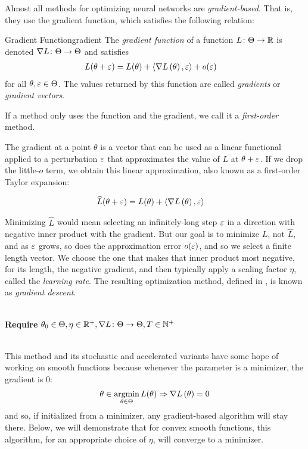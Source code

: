 \documentclass[../../thesis.tex]{subfiles}
\begin{document}
Almost all methods for optimizing neural networks
are \emph{gradient-based}.
That is, they use the gradient function,
which satisfies the following relation:

\begin{definition}{Gradient Function}{gradient}
	The \emph{gradient function} of a function $L \colon \Theta \to \mathbb{R}$
	is denoted $\nabla{L} \colon \Theta \to \Theta$
	and satisfies
	\begin{align}
		&L(\theta + \eps) = L(\theta) + \langle\grad{L}{\theta},\eps\rangle + o(\eps)\equationlabel{grad-def}
	\end{align}
	for all $\theta, \varepsilon \in \Theta$.
	The values returned by this function are called \emph{gradients}
	or \emph{gradient vectors}.
\end{definition}
\noindent If a method only uses the function and the gradient,
we call it a \emph{first-order} method.

The gradient at a point $\theta$ is a vector that can be used
as a linear functional applied to a perturbation $\varepsilon$ that approximates
the value of $L$ at $\theta + \varepsilon$.
If we drop the little-$o$ term,
we obtain this linear approximation,
also known as a first-order Taylor expansion:

\begin{align}
	&\widehat{L}(\theta + \varepsilon) = L(\theta) + \langle\nabla L\left(\theta\right),\varepsilon\rangle
\end{align}

Minimizing $\hat{L}$ would mean selecting an infinitely-long step $\varepsilon$
in a direction with negative inner product with the gradient.
But our goal is to minimize $L$, not $\hat{L}$,
and as $\varepsilon$ grows, so does the approximation error $o(\varepsilon)$,
and so we select a finite length vector.
We choose the one that makes that inner product most negative,
for its length,
the negative gradient,
and then typically apply a scaling factor $\eta$,
called the \emph{learning rate}.
The resulting optimization method,
defined in ,
is known as \emph{gradient descent}.
\\\\
\begin{algorithm}[H]
	\SetAlgoLined{}
	\textbf{Require} $\theta_0\in\Theta, \eta\in\mathbb{R}^+, \nabla{L}\colon\Theta\to\Theta, T\in\mathbb{N}^+$\\
	\caption{Gradient Descent}
\end{algorithm}
\ \\
This method
and its stochastic and accelerated variants
have some hope of working on smooth functions because
whenever the parameter is a minimizer,
the gradient
is $0$:
\begin{equation}\equationlabel{minimizers-critical}
	\theta \in \argmin_{\theta \in \Theta} L(\theta) \Rightarrow \grad{L}{\theta} = 0
\end{equation}
and so, if initialized from a minimizer,
any gradient-based algorithm will stay there.
Below, we will demonstrate that for
convex smooth functions,
this algorithm, for an appropriate choice of $\eta$,
will converge to a minimizer.
\end{document}
